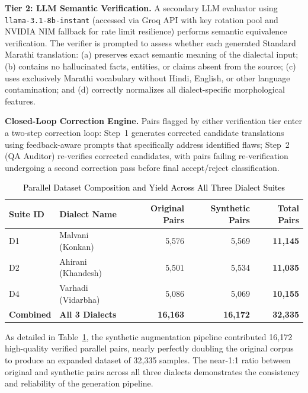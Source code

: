 \textbf{Tier 2: LLM Semantic Verification.} A secondary LLM evaluator using \texttt{llama-3.1-8b-instant} (accessed via Groq API with key rotation pool and NVIDIA NIM fallback for rate limit resilience) performs semantic equivalence verification. The verifier is prompted to assess whether each generated Standard Marathi translation: (a) preserves exact semantic meaning of the dialectal input; (b) contains no hallucinated facts, entities, or claims absent from the source; (c) uses exclusively Marathi vocabulary without Hindi, English, or other language contamination; and (d) correctly normalizes all dialect-specific morphological features.

\textbf{Closed-Loop Correction Engine.} Pairs flagged by either verification tier enter a two-step correction loop: Step~1 generates corrected candidate translations using feedback-aware prompts that specifically address identified flaws; Step~2 (QA Auditor) re-verifies corrected candidates, with pairs failing re-verification undergoing a second correction pass before final accept/reject classification.

\begin{table}[t]
\color{black}
\centering
\caption{\textcolor{black}{Parallel Dataset Composition and Yield Across All Three Dialect Suites}}
\label{tab:dataset_summary}
\begin{tabular}{llrrr}
\hline
\textbf{Suite ID} & \textbf{Dialect Name} & \textbf{Original Pairs} & \textbf{Synthetic Pairs} & \textbf{Total Pairs} \\
\hline
D1 & Malvani (Konkan)  & 5,576 & 5,569 & \textbf{11,145} \\
D2 & Ahirani (Khandesh) & 5,501 & 5,534 & \textbf{11,035} \\
D4 & Varhadi (Vidarbha) & 5,086 & 5,069 & \textbf{10,155} \\
\hline
\textbf{Combined} & \textbf{All 3 Dialects} & \textbf{16,163} & \textbf{16,172} & \textbf{32,335} \\
\hline
\end{tabular}
\end{table}

As detailed in Table~\ref{tab:dataset_summary}, the synthetic augmentation pipeline contributed 16,172 high-quality verified parallel pairs, nearly perfectly doubling the original corpus to produce an expanded dataset of 32,335 samples. The near-1:1 ratio between original and synthetic pairs across all three dialects demonstrates the consistency and reliability of the generation pipeline.


